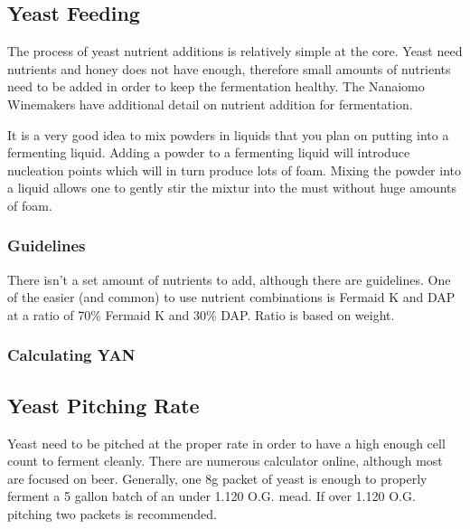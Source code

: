 \documentclass{article}
\begin{document}

 \subsection{Yeast Feeding}
  The process of yeast nutrient additions is relatively simple at the core. Yeast need nutrients and honey does 
  not have enough, therefore small amounts of nutrients need to be added in order to keep the fermentation healthy. 
  The Nanaiomo Winemakers have additional detail on nutrient addition for fermentation\cite{nanaiomo-fermentation}. 

  It is a very good idea to mix powders in liquids that you plan on putting into a fermenting liquid. 
  Adding a powder to a fermenting liquid will introduce nucleation points which will in turn produce lots of foam. 
  Mixing the powder into a liquid allows one to gently stir the mixtur into the must without huge amounts of foam.
  \subsubsection{Guidelines}
   There isn't a set amount of nutrients to add, although there are guidelines. One of the easier (and common) to 
   use nutrient combinations is Fermaid K and DAP at a ratio of 70\% Fermaid K and 30\% 
   DAP\cite{gotmead-fermaid-ratio}. Ratio is based on weight. 

  \subsubsection{Calculating YAN}

 \subsection{Yeast Pitching Rate}
  Yeast need to be pitched at the proper rate in order to have a high enough cell count to ferment cleanly. 
  There are numerous calculator online, although most
  are focused on beer. Generally, one 8g packet of yeast is enough to properly ferment a 5 gallon batch of an 
  under 1.120 O.G. mead. If over 1.120 O.G. pitching two packets is recommended. 
\end{document}
